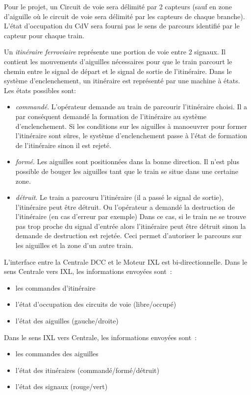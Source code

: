 \medskip
Pour le projet, un Circuit de voie sera délimité par 2 capteurs (sauf en zone d'aiguille où le circuit de voie sera 
délimité par les capteurs de chaque branche). L'état d'occupation du CdV sera fourni pas le sens de parcours 
identifié par le capteur pour chaque train.

\medskip
Un \emph{itinéraire ferroviaire} représente une portion de voie entre 2 signaux. Il contient les mouvements
d’aiguilles nécessaires pour que le train parcourt le chemin entre le signal de
départ et le signal de sortie de l'itinéraire. Dans le système d'enclenchement, un itinéraire
est représenté par une machine à états. Les états possibles sont:
\begin{itemize}
\item \emph{commandé}. L’opérateur demande au train de parcourir l’itinéraire
choisi. Il a par conséquent demandé la formation de l’itinéraire au
système d’enclenchement. Si les conditions sur les aiguilles à manoeuvrer
pour former l’itinéraire sont sûres, le système d’enclenchement
passe à l’état de formation de l’itinéraire sinon il est rejeté.
\item \emph{formé}. Les aiguilles sont positionnées dans la bonne direction. Il n’est
plus possible de bouger les aiguilles tant que le train se situe dans une
certaine zone.
\item \emph{détruit}. Le train a parcouru l’itinéraire (il a passé le signal de sortie), l'itinéraire peut
 être détruit. Ou l'opérateur a demandé la destruction de l'itinéraire (en cas d'erreur par exemple)
Dans ce cas, si le train ne se trouve pas trop proche du signal d'entrée alors l'itinéraire peut 
être détruit sinon la demande de destruction est rejetée. 
Ceci permet d'autoriser le parcours sur les aiguilles et la zone d’un autre train. 
\end{itemize}


L'interface entre la Centrale DCC et le Moteur IXL est bi-directionnelle. 
Dans le sens Centrale vers IXL, les informations envoyées sont~:
\begin{itemize}
\item les commandes d'itinéraire
\item l'état d'occupation des circuits de voie (libre/occupé)
\item l'état des aiguilles (gauche/droite)
\end{itemize}

Dans le sens IXL vers Centrale, les informations envoyées sont~:
\begin{itemize}
\item les commandes des aiguilles
\item l'état des itinéraires (commandé/formé/détruit)
\item l'état des signaux (rouge/vert)
\end{itemize}

